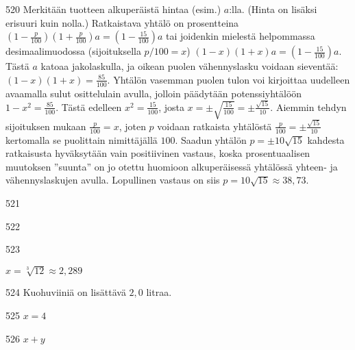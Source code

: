 \begin{Vastaus}{520}
	Merkitään tuotteen alkuperäistä hintaa (esim.) $a$:lla. (Hinta on lisäksi erisuuri kuin nolla.) Ratkaistava yhtälö on prosentteina $(1-\frac{p}{100})(1+\frac{p}{100})a=(1-\frac{15}{100})a$ tai joidenkin mielestä helpommassa desimaalimuodossa (sijoituksella $p/100=x$) $(1-x)(1+x)a=(1-\frac{15}{100})a$. Tästä $a$ katoaa jakolaskulla, ja oikean puolen vähennyslasku voidaan sieventää: $(1-x)(1+x)=\frac{85}{100}$. Yhtälön vasemman puolen tulon voi kirjoittaa uudelleen avaamalla sulut osittelulain avulla, jolloin päädytään potenssiyhtälöön $1-x^2=\frac{85}{100}$. Tästä edelleen $x^2=\frac{15}{100}$, josta $x=\pm \sqrt{\frac{15}{100}}=\pm \frac{\sqrt{15}}{10}$. Aiemmin tehdyn sijoituksen mukaan $\frac{p}{100}=x$, joten $p$ voidaan ratkaista yhtälöstä $\frac{p}{100}=\pm \frac{\sqrt{15}}{10}$ kertomalla se puolittain nimittäjällä $100$. Saadun yhtälön $p=\pm 10\sqrt{15}$ kahdesta ratkaisusta hyväksytään vain positiivinen vastaus, koska prosentuaalisen muutoksen ''suunta'' on jo otettu huomioon alkuperäisessä yhtälössä yhteen- ja vähennyslaskujen avulla. Lopullinen vastaus on siis $p=10\sqrt{15}\approx 38,73$.
	
\end{Vastaus}
\begin{Vastaus}{521}
	
\end{Vastaus}
\begin{Vastaus}{522}
    
\end{Vastaus}
\begin{Vastaus}{523}

$x=\sqrt[3]{12}\approx2,289$

    
\end{Vastaus}
\begin{Vastaus}{524}
	    Kuohuviiniä on lisättävä $2,0$ litraa.
    
\end{Vastaus}
\begin{Vastaus}{525}
	$x=4$
	
\end{Vastaus}
\begin{Vastaus}{526}
		$x+y$
		
\end{Vastaus}
